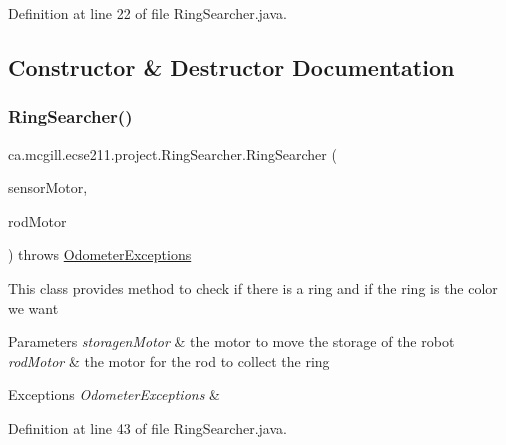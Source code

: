 Definition at line 22 of file Ring\+Searcher.\+java.



\subsection{Constructor \& Destructor Documentation}
\mbox{\label{classca_1_1mcgill_1_1ecse211_1_1project_1_1_ring_searcher_a37eebb6cbdfd692e0979c3ca0fe2597b}} 
\subsubsection{\texorpdfstring{Ring\+Searcher()}{RingSearcher()}}
{\footnotesize\ttfamily ca.\+mcgill.\+ecse211.\+project.\+Ring\+Searcher.\+Ring\+Searcher (\begin{DoxyParamCaption}\item[{E\+V3\+Large\+Regulated\+Motor}]{sensor\+Motor,  }\item[{E\+V3\+Large\+Regulated\+Motor}]{rod\+Motor }\end{DoxyParamCaption}) throws \hyperlink{classca_1_1mcgill_1_1ecse211_1_1odometer_1_1_odometer_exceptions}{Odometer\+Exceptions}}

This class provides method to check if there is a ring and if the ring is the color we want


\begin{DoxyParams}{Parameters}
{\em storagen\+Motor} & the motor to move the storage of the robot \\
\hline
{\em rod\+Motor} & the motor for the rod to collect the ring \\
\hline
\end{DoxyParams}

\begin{DoxyExceptions}{Exceptions}
{\em Odometer\+Exceptions} & \\
\hline
\end{DoxyExceptions}


Definition at line 43 of file Ring\+Searcher.\+java.


